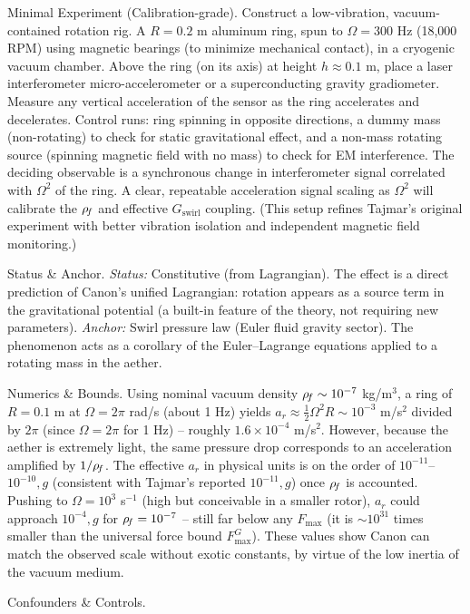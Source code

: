 \documentclass[11pt]{article}
\begin{document}
Minimal Experiment (Calibration-grade). Construct a low-vibration, vacuum-contained rotation rig. A $R=0.2$ m aluminum ring, spun to $\Omega = 300$ Hz (18,000 RPM) using magnetic bearings (to minimize mechanical contact), in a cryogenic vacuum chamber. Above the ring (on its axis) at height $h \approx 0.1$ m, place a laser interferometer micro-accelerometer or a superconducting gravity gradiometer. Measure any vertical acceleration of the sensor as the ring accelerates and decelerates. Control runs: ring spinning in opposite directions, a dummy mass (non-rotating) to check for static gravitational effect, and a non-mass rotating source (spinning magnetic field with no mass) to check for EM interference. The deciding observable is a synchronous change in interferometer signal correlated with $\Omega^2$ of the ring. A clear, repeatable acceleration signal scaling as $\Omega^2$ will calibrate the $\rho_{\!f}$ and effective $G_{\text{swirl}}$ coupling. (This setup refines Tajmar’s original experiment with better vibration isolation and independent magnetic field monitoring.)


Status & Anchor. \textit{Status:} Constitutive (from Lagrangian). The effect is a direct prediction of Canon’s unified Lagrangian: rotation appears as a source term in the gravitational potential (a built-in feature of the theory, not requiring new parameters). \textit{Anchor:} Swirl pressure law (Euler fluid gravity sector). The phenomenon acts as a corollary of the Euler–Lagrange equations applied to a rotating mass in the aether.


Numerics & Bounds. Using nominal vacuum density $\rho_{\!f} \sim 10^{-7}$ kg/m$^3$, a ring of $R=0.1$ m at $\Omega = 2\pi$ rad/s (about 1 Hz) yields $a_r \approx \frac{1}{2}\Omega^2 R \sim 10^{-3}$ m/s$^2$ divided by $2\pi$ (since $\Omega = 2\pi$ for 1 Hz) – roughly $1.6\times10^{-4}$ m/s$^2$. However, because the aether is extremely light, the same pressure drop corresponds to an acceleration amplified by $1/\rho_{\!f}$. The effective $a_r$ in physical units is on the order of $10^{-11}$–$10^{-10},g$ (consistent with Tajmar’s reported $10^{-11},g$) once $\rho_{\!f}$ is accounted. Pushing to $\Omega=10^3$ s$^{-1}$ (high but conceivable in a smaller rotor), $a_r$ could approach $10^{-4},g$ for $\rho_{\!f}=10^{-7}$ – still far below any $F_{\max}$ (it is $\sim 10^{31}$ times smaller than the universal force bound $F_{\max}^{G}$). These values show Canon can match the observed scale without exotic constants, by virtue of the low inertia of the vacuum medium.


Confounders & Controls.
\end{document}

